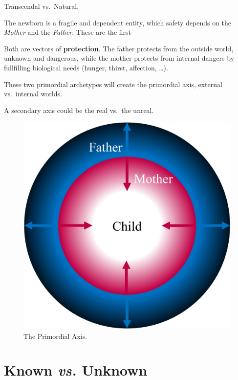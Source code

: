 \documentclass[]{book}
\begin{document}
Transcendal vs.~Natural.

The newborn is a fragile and dependent entity, which safety depends on the \emph{Mother} and the \emph{Father}. These are the first

Both are vectors of \textbf{protection}. The father protects from the outside world, unknown and dangerous, while the mother protects from internal dangers by fullfilling biological needs (hunger, thirst, affection, \ldots).

These two primordial archetypes will create the primordial axis, external vs.~internal worlds.

A secondary axis could be the real vs.~the unreal.

\begin{figure}

{\centering \includegraphics[width=\textwidth]{img/protection} 

}

\caption{The Primordial Axis.}\label{fig:unnamed-chunk-2}
\end{figure}

\hypertarget{known-vs.-unknown}{%
\section{\texorpdfstring{Known \emph{vs.} Unknown}{Known vs. Unknown}}\label{known-vs.-unknown}}
\end{document}
